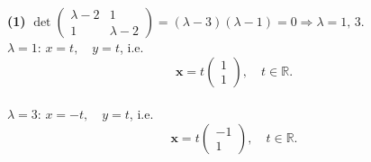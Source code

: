 \noindent\textbf{(1)} $\det\begin{pmatrix}\lambda-2&1\\1&\lambda-2\end{pmatrix}=\left(\lambda - 3\right) \left(\lambda - 1\right)=0\Rightarrow\lambda=1,\,3$.
\\ $\lambda=1$: $x=t, \quad y=t$, i.e. \[ \mathbf{x}=t\begin{pmatrix}1 \\ 1\end{pmatrix}, \quad t\in\mathbb{R}. \]
\\ $\lambda=3$: $x=- t, \quad y=t$, i.e. \[ \mathbf{x}=t\begin{pmatrix}-1 \\ 1\end{pmatrix}, \quad t\in\mathbb{R}. \]


